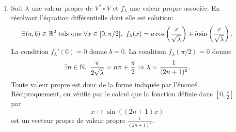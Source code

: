 \begin{enumerate}
\item Soit $\lambda$ une valeur propre de $V^{*}\circ V$ et $f_{\lambda}$ une valeur propre associée. En résolvant l'équation différentielle dont elle est solution:
\begin{displaymath}
\exists(a,b)\in\mathbb{R}^2 \text{ tels que }\forall x\in [0,\pi/2],\ f_{\lambda}(x) = a\cos \left ( \frac{x}{\sqrt{\lambda}} \right ) + b\sin \left ( \frac{x}{\sqrt{\lambda}}\right).
\end{displaymath}
La condition $f_{\lambda}'(0) = 0$ donne $b=0$. La condition $f_{\lambda}(\pi /2)=0$ donne:
\begin{displaymath}
\exists n\in \N,\ \frac{\pi}{2\sqrt{\lambda}} = n\pi + \frac{\pi}{2} \Rightarrow \lambda = \frac{1}{(2n+1)^{2}}.
\end{displaymath}
Toute valeur propre est donc de la forme indiquée par l'énoncé.\newline
Réciproquement, on vérifie par le calcul que la fonction définie dans $[0,\frac{\pi}{2}]$ par
\begin{displaymath}
  x\mapsto \sin((2n+1)x)
\end{displaymath}
est un vecteur propre de valeur propre $\frac{1}{(2n+1)^{2}}$.
\end{enumerate}

